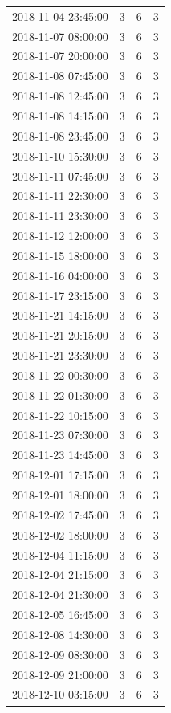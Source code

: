 \begin{tabular}{lrrr}
2018-11-04 23:45:00 & 3 & 6 & 3 \\
2018-11-07 08:00:00 & 3 & 6 & 3 \\
2018-11-07 20:00:00 & 3 & 6 & 3 \\
2018-11-08 07:45:00 & 3 & 6 & 3 \\
2018-11-08 12:45:00 & 3 & 6 & 3 \\
2018-11-08 14:15:00 & 3 & 6 & 3 \\
2018-11-08 23:45:00 & 3 & 6 & 3 \\
2018-11-10 15:30:00 & 3 & 6 & 3 \\
2018-11-11 07:45:00 & 3 & 6 & 3 \\
2018-11-11 22:30:00 & 3 & 6 & 3 \\
2018-11-11 23:30:00 & 3 & 6 & 3 \\
2018-11-12 12:00:00 & 3 & 6 & 3 \\
2018-11-15 18:00:00 & 3 & 6 & 3 \\
2018-11-16 04:00:00 & 3 & 6 & 3 \\
2018-11-17 23:15:00 & 3 & 6 & 3 \\
2018-11-21 14:15:00 & 3 & 6 & 3 \\
2018-11-21 20:15:00 & 3 & 6 & 3 \\
2018-11-21 23:30:00 & 3 & 6 & 3 \\
2018-11-22 00:30:00 & 3 & 6 & 3 \\
2018-11-22 01:30:00 & 3 & 6 & 3 \\
2018-11-22 10:15:00 & 3 & 6 & 3 \\
2018-11-23 07:30:00 & 3 & 6 & 3 \\
2018-11-23 14:45:00 & 3 & 6 & 3 \\
2018-12-01 17:15:00 & 3 & 6 & 3 \\
2018-12-01 18:00:00 & 3 & 6 & 3 \\
2018-12-02 17:45:00 & 3 & 6 & 3 \\
2018-12-02 18:00:00 & 3 & 6 & 3 \\
2018-12-04 11:15:00 & 3 & 6 & 3 \\
2018-12-04 21:15:00 & 3 & 6 & 3 \\
2018-12-04 21:30:00 & 3 & 6 & 3 \\
2018-12-05 16:45:00 & 3 & 6 & 3 \\
2018-12-08 14:30:00 & 3 & 6 & 3 \\
2018-12-09 08:30:00 & 3 & 6 & 3 \\
2018-12-09 21:00:00 & 3 & 6 & 3 \\
2018-12-10 03:15:00 & 3 & 6 & 3 \\

\end{tabular}
